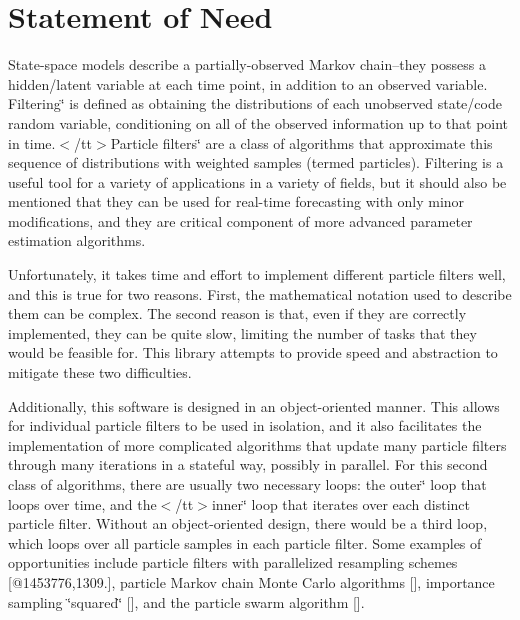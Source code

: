 \section*{Statement of Need}

State-\/space models describe a partially-\/observed Markov chain--they possess a hidden/latent variable at each time point, in addition to an observed variable. {\ttfamily Filtering\char`\"{} is defined as obtaining the distributions of each unobserved state/code random variable, conditioning on all of the observed information up to that point in time.$<$/tt$>$\+Particle filters\char`\"{} are a class of algorithms that approximate this sequence of distributions with weighted samples (termed particles). Filtering is a useful tool for a variety of applications in a variety of fields, but it should also be mentioned that they can be used for real-\/time forecasting with only minor modifications, and they are critical component of more advanced parameter estimation algorithms.}

{\ttfamily Unfortunately, it takes time and effort to implement different particle filters well, and this is true for two reasons. First, the mathematical notation used to describe them can be complex. The second reason is that, even if they are correctly implemented, they can be quite slow, limiting the number of tasks that they would be feasible for. This library attempts to provide speed and abstraction to mitigate these two difficulties.}

{\ttfamily Additionally, this software is designed in an object-\/oriented manner. This allows for individual particle filters to be used in isolation, and it also facilitates the implementation of more complicated algorithms that update many particle filters through many iterations in a stateful way, possibly in parallel. For this second class of algorithms, there are usually two necessary loops\+: the {\ttfamily outer\char`\"{} loop that loops over time, and the$<$/tt$>$inner\char`\"{} loop that iterates over each distinct particle filter. Without an object-\/oriented design, there would be a third loop, which loops over all particle samples in each particle filter. Some examples of opportunities include particle filters with parallelized resampling schemes \mbox{[}@1453776,1309.\mbox{]}, particle Markov chain Monte Carlo algorithms \mbox{[}\mbox{]}, importance sampling \char`\"{}squared\char`\"{} \mbox{[}\mbox{]}, and the particle swarm algorithm \mbox{[}\mbox{]}.}}

{}

